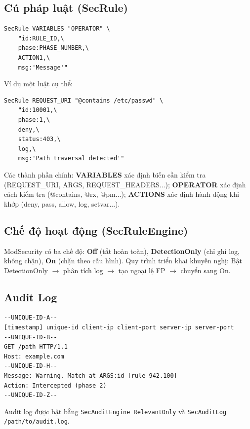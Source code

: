 \documentclass[12pt,a4paper,twoside]{report}
\begin{document}
\subsection{Cú pháp luật (SecRule)}

\begin{lstlisting}[caption=Cấu trúc một luật ModSecurity,basicstyle=\small\ttfamily]
SecRule VARIABLES "OPERATOR" \
    "id:RULE_ID,\
    phase:PHASE_NUMBER,\
    ACTION1,\
    msg:'Message'"
\end{lstlisting}

Ví dụ một luật cụ thể:

\begin{lstlisting}[caption=Luật chặn path traversal]
SecRule REQUEST_URI "@contains /etc/passwd" \
    "id:10001,\
    phase:1,\
    deny,\
    status:403,\
    log,\
    msg:'Path traversal detected'"
\end{lstlisting}

Các thành phần chính: \textbf{VARIABLES} xác định biến cần kiểm tra (REQUEST\_URI, ARGS, REQUEST\_HEADERS...); \textbf{OPERATOR} xác định cách kiểm tra (@contains, @rx, @pm...); \textbf{ACTIONS} xác định hành động khi khớp (deny, pass, allow, log, setvar...).

\subsection{Chế độ hoạt động (SecRuleEngine)}

ModSecurity có ba chế độ: \textbf{Off} (tắt hoàn toàn), \textbf{DetectionOnly} (chỉ ghi log, không chặn), \textbf{On} (chặn theo cấu hình). Quy trình triển khai khuyến nghị: Bật DetectionOnly $\rightarrow$ phân tích log $\rightarrow$ tạo ngoại lệ FP $\rightarrow$ chuyển sang On.

\subsection{Audit Log}

\begin{lstlisting}[caption=Cấu trúc audit log,basicstyle=\tiny\ttfamily]
--UNIQUE-ID-A--
[timestamp] unique-id client-ip client-port server-ip server-port
--UNIQUE-ID-B--
GET /path HTTP/1.1
Host: example.com
--UNIQUE-ID-H--
Message: Warning. Match at ARGS:id [rule 942.100]
Action: Intercepted (phase 2)
--UNIQUE-ID-Z--
\end{lstlisting}

Audit log được bật bằng \texttt{SecAuditEngine RelevantOnly} và \texttt{SecAuditLog /path/to/audit.log}.
\end{document}
